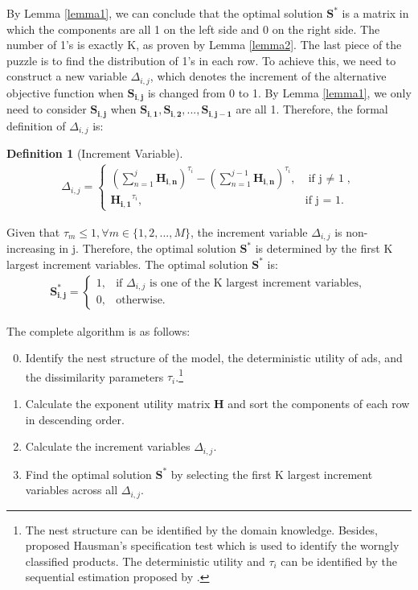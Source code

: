 \documentclass[12pt]{article}
\theoremstyle{definition}
\newtheorem{definition}{Definition}[section]
\newcommand{\matr}[1]{\mathbf{#1}} %
\begin{document}
\begin{sloppypar}
By Lemma \ref{lemma1}, we can conclude that the optimal solution $\matr{S^*}$ is a matrix in which the components are all 1 on the left side and 0 on the right side. The number of 1's is exactly K, as proven by Lemma \ref{lemma2}. The last piece of the puzzle is to find the distribution of 1's in each row. To achieve this, we need to construct a new variable $\Delta_{i,j}$, which denotes the increment of the alternative objective function when $\matr{S_{i,j}}$ is changed from 0 to 1. By Lemma \ref{lemma1}, we only need to consider $\matr{S_{i,j}}$ when $\matr{S_{i,1}}, \matr{S_{i,2}}, ..., \matr{S_{i,j-1}}$ are all 1. Therefore, the formal definition of $\Delta_{i,j}$ is:
\begin{definition}[Increment Variable]\label{increment}
    \begin{align*}
    \Delta_{i,j} = 
    \begin{cases}
        (\sum\limits_{n=1}^{j} \matr{H_{i,n}})^{\tau_i} - (\sum\limits_{n=1}^{j-1} \matr{H_{i,n}})^{\tau_i}, &\text{if j $\neq$ 1},\\
        \matr{H_{i,1}}^{\tau_i}, &\text{if j = 1}.
    \end{cases}
    \end{align*}
\end{definition}

Given that $\tau_m \leq 1, \forall m \in \{1,2,...,M\}$, the increment variable $\Delta_{i,j}$ is non-increasing in j. Therefore, the optimal solution $\matr{S^*}$ is determined by the first K largest increment variables. The optimal solution $\matr{S^*}$ is:
\begin{align}
    \matr{S^*_{i,j}} = 
    \begin{cases}
        1, &\text{if $\Delta_{i,j}$ is one of the K largest increment variables},\\
        0, &\text{otherwise}.
    \end{cases}
\end{align}

The complete algorithm is as follows:
\begin{enumerate}
    \setcounter{enumi}{-1}
    \item Identify the nest structure of the model, the deterministic utility of ads, and the dissimilarity parameters $\tau_i$.\footnote{The nest structure can be identified by the domain knowledge. Besides, \textcite{hausman1978} proposed Hausman's specification test which is used to identify the worngly classified products. The deterministic utility and $\tau_i$ can be identified by the sequential estimation proposed by \textcite{train}.}
    \item Calculate the exponent utility matrix $\matr{H}$ and sort the components of each row in descending order.
    \item Calculate the increment variables $\Delta_{i,j}$.
    \item Find the optimal solution $\matr{S^*}$ by selecting the first K largest increment variables across all $\Delta_{i,j}$.
\end{enumerate}


\end{sloppypar}
\end{document}

